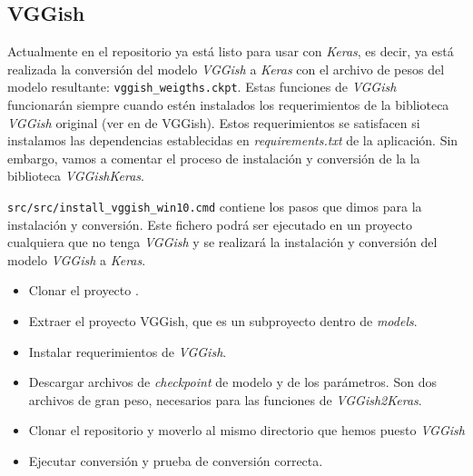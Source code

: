 \subsection{VGGish}\label{subsec:vggishinstall}
Actualmente en el repositorio ya está listo para usar con \textit{Keras}, es decir, ya está realizada la conversión del modelo \textit{VGGish} a \textit{Keras} con el archivo de pesos del modelo resultante: \texttt{vggish\_weigths.ckpt}. Estas funciones de \textit{VGGish} funcionarán siempre cuando estén instalados los requerimientos de la biblioteca \textit{VGGish} original (ver en  de VGGish). Estos requerimientos se satisfacen si instalamos las dependencias establecidas en \textit{requirements.txt} de la aplicación. Sin embargo, vamos a comentar el proceso de instalación y conversión de la la biblioteca \textit{VGGishKeras}.

\texttt{src/src/install\_vggish\_win10.cmd} contiene los pasos que dimos para la instalación y conversión. Este fichero podrá ser ejecutado en un proyecto cualquiera que no tenga \textit{VGGish} y se realizará la instalación y conversión del modelo \textit{VGGish} a \textit{Keras}.
\begin{itemize}
\item Clonar el proyecto .
\item Extraer el proyecto VGGish, que es un subproyecto dentro de  \textit{models}.
\item Instalar requerimientos de \textit{VGGish}.
\item Descargar archivos de \textit{checkpoint} de modelo y de los parámetros. Son dos archivos de gran peso, necesarios para las funciones de \textit{VGGish2Keras}.
\item Clonar el repositorio  y moverlo al mismo directorio que hemos puesto \textit{VGGish}
\item Ejecutar conversión y prueba de conversión correcta.
\end{itemize}


